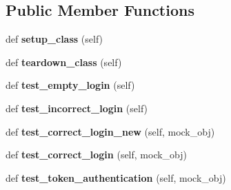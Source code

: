 \subsection*{Public Member Functions}
\begin{DoxyCompactItemize}
\item 
\mbox{\label{classapp_1_1users_1_1test__user_1_1_test_user_a7a3df437f60d36aefa0828c1a2fc56c2}} 
def {\bfseries setup\+\_\+class} (self)
\item 
\mbox{\label{classapp_1_1users_1_1test__user_1_1_test_user_af75734ea358ec3a207281a45ee0a6ac3}} 
def {\bfseries teardown\+\_\+class} (self)
\item 
\mbox{\label{classapp_1_1users_1_1test__user_1_1_test_user_a3f1ed3f962b7be6e8decb6e99e94f735}} 
def {\bfseries test\+\_\+empty\+\_\+login} (self)
\item 
\mbox{\label{classapp_1_1users_1_1test__user_1_1_test_user_a2f6aca4208120bf255fa62c0405a23d9}} 
def {\bfseries test\+\_\+incorrect\+\_\+login} (self)
\item 
\mbox{\label{classapp_1_1users_1_1test__user_1_1_test_user_a32bf825943701a5986f7dee920da7d5b}} 
def {\bfseries test\+\_\+correct\+\_\+login\+\_\+new} (self, mock\+\_\+obj)
\item 
\mbox{\label{classapp_1_1users_1_1test__user_1_1_test_user_a60e969371ae4e475dd6969b5985e9393}} 
def {\bfseries test\+\_\+correct\+\_\+login} (self, mock\+\_\+obj)
\item 
\mbox{\label{classapp_1_1users_1_1test__user_1_1_test_user_aad37ae491d668c5f8b64c631da61a96f}} 
def {\bfseries test\+\_\+token\+\_\+authentication} (self, mock\+\_\+obj)
\end{DoxyCompactItemize}
